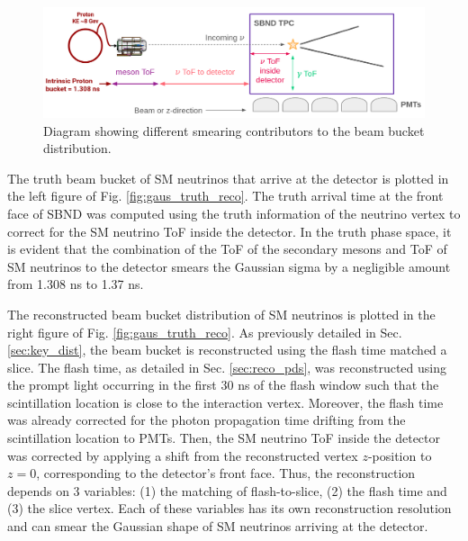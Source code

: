 \begin{figure}[h!]
    \centering
    \includegraphics[width=1.0\textwidth]{smearing_factors.png}
    \caption{Diagram showing different smearing contributors to the beam bucket distribution.}
    \label{fig:smearing_factors}
\end{figure}

The truth beam bucket of SM neutrinos that arrive at the detector is plotted in the left figure of Fig. \ref{fig:gaus_truth_reco}.
The truth arrival time at the front face of SBND was computed using the truth information of the neutrino vertex to correct for the SM neutrino ToF inside the detector.
In the truth phase space, it is evident that the combination of the ToF of the secondary mesons and ToF of SM neutrinos to the detector smears the Gaussian sigma by a negligible amount from 1.308 ns to 1.37 ns.

The reconstructed beam bucket distribution of SM neutrinos is plotted in the right figure of Fig. \ref{fig:gaus_truth_reco}.
As previously detailed in Sec. \ref{sec:key_dist}, the beam bucket is reconstructed using the flash time matched a slice.
The flash time, as detailed in Sec. \ref{sec:reco_pds}, was reconstructed using the prompt light occurring in the first 30 ns of the flash window such that the scintillation location is close to the interaction vertex.
Moreover, the flash time was already corrected for the photon propagation time drifting from the scintillation location to PMTs.
Then, the SM neutrino ToF inside the detector was corrected by applying a shift from the reconstructed vertex $z$-position to $z = 0$, corresponding to the detector's front face.
Thus, the reconstruction depends on 3 variables: (1) the matching of flash-to-slice, (2) the flash time and (3) the slice vertex.
Each of these variables has its own reconstruction resolution and can smear the Gaussian shape of SM neutrinos arriving at the detector.


